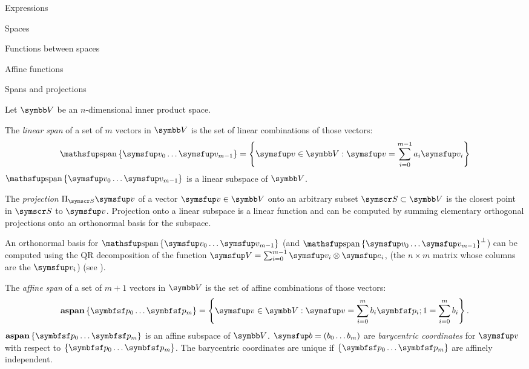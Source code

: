 \documentclass[12pt]{PalisadesLakesArticle}
\begin{document}
\begin{plSection}{Expressions}
\begin{plSection}{Spaces}
\begin{plSection}{Functions between spaces}
\begin{plSection}{Affine functions}
\end{plSection}%
\begin{plSection}{Spans and projections}
\label{sec:spans-and-projections}

Let $\Space{V}$ be an $n$-dimensional inner product space.

The \textit{linear span} of a set of $m$ vectors in $\Space{V}$
is the set of linear combinations of those vectors:
\begin{equation}
\linearspan\left\{ \Vector{v}_0 \ldots \Vector{v}_{m-1} \right\} = \left\{\Vector{v} \in \Space{V} : \Vector{v} = \sum_{i=0}^{m-1} a_i \Vector{v}_i\right\}
\end{equation}
$\linearspan\left\{ \Vector{v}_0 \ldots \Vector{v}_{m-1} \right\}$ is a linear subspace of $\Space{V}$.

The \textit{projection} $\Projection_{\Set{S}} \Vector{v}$ of a vector $\Vector{v} \in \Space{V}$
onto an arbitrary subset $\Set{S} \subset \Space{V}$
is the closest point in $\Set{S}$ to $\Vector{v}$.
Projection onto a linear subspace is a linear function and
can be computed by summing
elementary orthogonal projections onto an orthonormal basis for the subspace.

An orthonormal basis for $\linearspan\left\{ \Vector{v}_0 \ldots \Vector{v}_{m-1} \right\}$
(and $\linearspan\left\{ \Vector{v}_0 \ldots \Vector{v}_{m-1} \right\}^\perp$)
can be computed using the QR decomposition
of the function $\Vector{V} = \sum_{i=0}^{m-1} \Vector{v}_i \otimes \Vector{e}_i$,
(the $n \times m$ matrix whose columns are the $\Vector{v}_i$)
(see ).

The \textit{affine span} of a set of $m+1$ vectors in $\Space{V}$
is the set of affine combinations of those vectors:
\begin{equation}
\affinespan\left\{ \Point{p}_0 \ldots \Point{p}_{m} \right\} = \left\{\Vector{v} \in \Space{V} : \Vector{v} = \sum_{i=0}^{m} b_i \Point{p}_i;
1 = \sum_{i=0}^{m} b_i \right\}.
\end{equation}
$\affinespan\left\{ \Point{p}_0 \ldots \Point{p}_{m} \right\}$ is an affine subspace of $\Space{V}$.
$\Vector{b} = ( b_0 \ldots b_m )$ are \textit{barycentric coordinates}
for $\Vector{v}$ with respect to $\left\{ \Point{p}_0 \ldots \Point{p}_{m} \right\}$.
The barycentric coordinates are unique if $\left\{ \Point{p}_0 \ldots \Point{p}_{m} \right\}$
are affinely independent.


\end{plSection}
\end{plSection}
\end{plSection}
\end{plSection}
\end{document}

